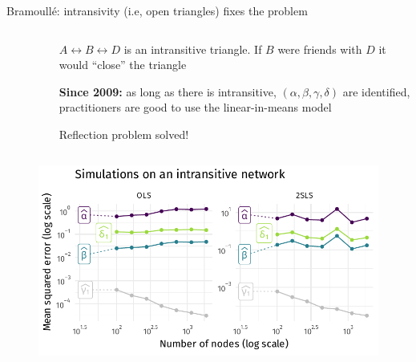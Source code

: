 \documentclass[aspectratio=169]{beamer}
\theoremstyle{remark}
\begin{document}
\begin{frame}{Bramoull\'e: intransivity (i.e, open triangles) fixes the problem}
    
    \begin{columns}
        \begin{column}{0.5\textwidth}
            \begin{figure}
                \centering
            \end{figure}
        \end{column}
        \begin{column}{0.5\textwidth}
            
            $A \leftrightarrow B \leftrightarrow D$ is an intransitive triangle. If $B$ were friends with $D$ it would ``close'' the triangle
            
            \vspace{4mm}
            
            \textbf{Since 2009:} as long as there is intransitive, $(\alpha, \beta, \gamma, \delta)$ are identified, practitioners are good to use the linear-in-means model
            
            \vspace{4mm}
            
            Reflection problem solved!
        \end{column}
    \end{columns}
\end{frame}

\begin{frame}
    \begin{figure}
        \centering
        \includegraphics{figures/simulations/defense-mse.pdf}
    \end{figure}
\end{frame}
\end{document}
